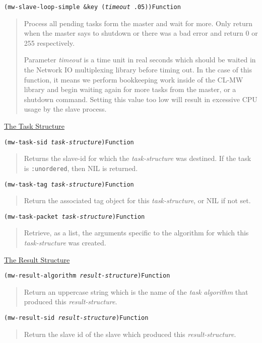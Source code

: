 \documentclass[titlepage,12pt]{book}
\newcommand{\xsmall}{\latexhtml{\small}{}}
\newcommand{\xnormalsize}{\latexhtml{\normalsize}{}}
\newcommand{\clmw}{\xsmall\textsc{CL-MW}\xnormalsize\xspace}
\newcommand{\ta}{\textit{task algorithm}\xspace}
\newcommand{\un}{\texttt{:unordered}\xspace}
\newcommand{\apiheader}[1]{\begin{center}\underline{#1}\end{center}}
\newcommand{\apifunc}[2]{\noindent\xsmall\texttt{(#1)}\hspace*{\fill}\xnormalsize\texttt{#2}}
\newenvironment{apientry}[2]
	{\apifunc{#1}{#2}\begin{quotation}}
	{\end{quotation}}
\begin{document}
\begin{apientry}
{mw-slave-loop-simple \&key (\emph{timeout} .05)}
{Function}
Process all pending tasks form the master and wait for more. Only
return when the master says to shutdown or there was a bad error and
return 0 or 255 respectively.

Parameter \emph{timeout} is a time unit in real seconds which should
be waited in the Network IO multiplexing library before timing out.
In the case of this function, it means we perform bookkeeping work
inside of the \clmw library and begin waiting again for more tasks
from the master, or a shutdown command. Setting this value too low
will result in excessive CPU usage by the slave process.
\end{apientry}

\apiheader{The Task Structure}
\begin{apientry}
{mw-task-sid \emph{task-structure}}
{Function}
Returns the slave-id for which the \emph{task-structure} was destined. 
If the task is \un, then NIL is returned.
\end{apientry}

\begin{apientry}
{mw-task-tag \emph{task-structure}}
{Function}
Return the associated tag object for this \emph{task-structure}, or NIL 
if not set.
\end{apientry}

\begin{apientry}
{mw-task-packet \emph{task-structure}}
{Function}
Retrieve, as a list, the arguments specific to the algorithm for
which this \emph{task-structure} was created.
\end{apientry}

\apiheader{The Result Structure}
\begin{apientry}
{mw-result-algorithm \emph{result-structure}}
{Function}
Return an uppercase string which is the name of the \ta that produced this
\emph{result-structure}.
\end{apientry}

\begin{apientry}
{mw-result-sid \emph{result-structure}}
{Function}
Return the slave id of the slave which produced this \emph{result-structure}.
\end{apientry}
\end{document}
